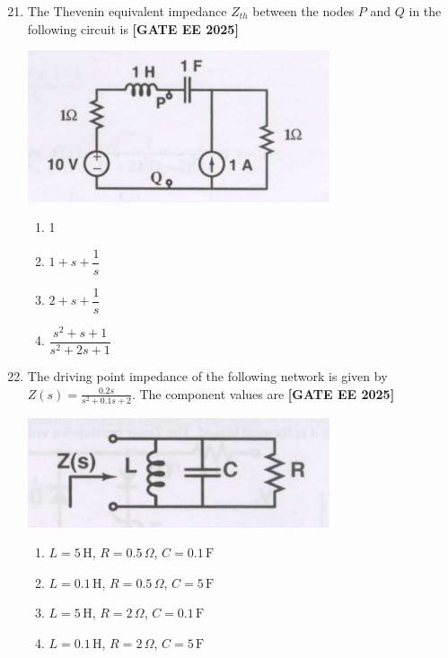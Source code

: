 \documentclass[12pt,a4paper]{article}
\begin{document}
\begin{enumerate}[leftmargin=*, label=\textbf{Q.\arabic*:}]
\setcounter{enumi}{20}

\item The Thevenin equivalent impedance $Z_{th}$ between the nodes $P$ and $Q$ in the following circuit is
\newline
\noindent \textbf{[GATE EE 2025]}
\begin{center}
\includegraphics[width=0.7\textwidth]{figs/q21.png}
\end{center}
\begin{enumerate}[label=(\Alph*)]
  \item 1
  \item $1+s+\dfrac{1}{s}$
  \item $2+s+\dfrac{1}{s}$
  \item $\dfrac{s^2+s+1}{s^2+2s+1}$
\end{enumerate}

\item The driving point impedance of the following network is given by $Z(s)=\frac{0.2s}{s^2+0.1s+2}$. The component values are
\newline
\noindent \textbf{[GATE EE 2025]}
\begin{center}
\includegraphics[width=0.7\textwidth]{figs/q22.png}
\end{center}

\begin{enumerate}[label=(\Alph*)]
  \item $L=5\,\text{H}$, $R=0.5\,\Omega$, $C=0.1\,\text{F}$
  \item $L=0.1\,\text{H}$, $R=0.5\,\Omega$, $C=5\,\text{F}$
  \item $L=5\,\text{H}$, $R=2\,\Omega$, $C=0.1\,\text{F}$
  \item $L=0.1\,\text{H}$, $R=2\,\Omega$, $C=5\,\text{F}$
\end{enumerate}


\end{enumerate}
\end{document}
